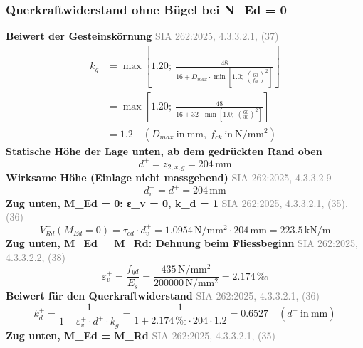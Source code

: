 \documentclass[11pt,a4paper]{article}
\newcommand{\normref}[1]{{\small\textcolor{gray}{#1}}}
\begin{document}
\subsubsection{Querkraftwiderstand ohne Bügel bei N\_Ed = 0}
\noindent\textbf{Beiwert der Gesteinskörnung} \hfill \normref{SIA 262:2025, 4.3.3.2.1, (37)}
\begin{equation*}
\begin{aligned}
  k_g &= \max\left[1.20;\ \frac{48}{16 + D_{max} \cdot \min\left[1.0;\ \left(\frac{60}{f_{ck}}\right)^{2}\right]}\right] \\
  &= \max\left[1.20;\ \frac{48}{16 + 32 \cdot \min\left[1.0;\ \left(\frac{60}{30}\right)^{2}\right]}\right] \\
  &= 1.2 \quad \left(D_{max}\ \text{in}\ \mathrm{mm},\ f_{ck}\ \text{in}\ \mathrm{N}/\mathrm{mm}^{2}\right)
\end{aligned}
\end{equation*}
\noindent\textbf{Statische Höhe der Lage unten, ab dem gedrückten Rand oben}
\begin{equation*}
d^{+} = z_{2,x,g} = 204\,\mathrm{mm}
\end{equation*}
\noindent\textbf{Wirksame Höhe (Einlage nicht massgebend)} \hfill \normref{SIA 262:2025, 4.3.3.2.9}
\begin{equation*}
d_v^{+} = d^{+} = 204\,\mathrm{mm}
\end{equation*}
\noindent\textbf{Zug unten, M\_Ed = 0: ε\_v = 0, k\_d = 1} \hfill \normref{SIA 262:2025, 4.3.3.2.1, (35), (36)}
\begin{equation*}
V_{Rd}^{+}(M_{Ed} = 0) = \tau_{cd} \cdot d_v^{+} = 1.0954\,\mathrm{N}/\mathrm{mm}^{2} \cdot 204\,\mathrm{mm} = 223.5\,\mathrm{kN}/\mathrm{m}
\end{equation*}
\noindent\textbf{Zug unten, M\_Ed = M\_Rd: Dehnung beim Fliessbeginn} \hfill \normref{SIA 262:2025, 4.3.3.2.2, (38)}
\begin{equation*}
\varepsilon_v^{+} = \frac{f_{yd}}{E_s} = \frac{435\,\mathrm{N}/\mathrm{mm}^{2}}{200000\,\mathrm{N}/\mathrm{mm}^{2}} = 2.174\,\text{‰}
\end{equation*}
\noindent\textbf{Beiwert für den Querkraftwiderstand} \hfill \normref{SIA 262:2025, 4.3.3.2.1, (36)}
\begin{equation*}
k_d^{+} = \frac{1}{1 + \varepsilon_v^{+} \cdot d^{+} \cdot k_g} = \frac{1}{1 + 2.174\,\text{‰} \cdot 204 \cdot 1.2} = 0.6527 \quad \left(d^{+}\ \text{in}\ \mathrm{mm}\right)
\end{equation*}
\noindent\textbf{Zug unten, M\_Ed = M\_Rd} \hfill \normref{SIA 262:2025, 4.3.3.2.1, (35)}
\end{document}
